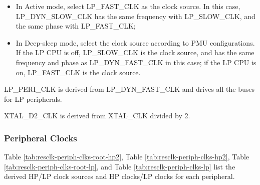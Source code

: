 \documentclass[main\_\_EN.tex]{subfiles}
\begin{document}
\begin{itemize}
    \item In Active mode, select LP\_FAST\_CLK as the clock source. In this case, LP\_DYN\_SLOW\_CLK has the same frequency with LP\_SLOW\_CLK, and the same phase with LP\_FAST\_CLK;
    \item In Deep-sleep mode, select the clock source according to PMU configurations. If the LP CPU is off, LP\_SLOW\_CLK is the clock source, and has the same frequency and phase as LP\_DYN\_FAST\_CLK in this case; if the LP CPU is on, LP\_FAST\_CLK is the clock source.
\end{itemize}

LP\_PERI\_CLK is derived from LP\_DYN\_FAST\_CLK and drives all the buses for LP peripherals.

XTAL\_D2\_CLK is derived from XTAL\_CLK divided by 2.

\subsubsection{Peripheral Clocks}\label{sec:peri_clk}

Table \ref{tab:resclk-periph-clks-root-hp2}, Table \ref{tab:resclk-periph-clks-hp2}, Table \ref{tab:resclk-periph-clks-root-lp}, and Table \ref{tab:resclk-periph-clks-lp} list the derived HP/LP clock sources and HP clocks/LP clocks for each peripheral.
\end{document}
